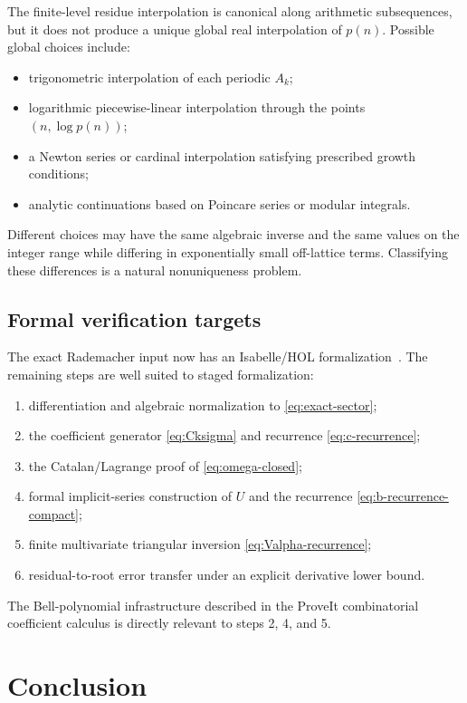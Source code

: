 \documentclass[11pt,a4paper]{article}
\numberwithin{equation}{section}
\theoremstyle{remark}
\begin{document}
The finite-level residue interpolation is canonical along arithmetic subsequences, but it does not produce a unique global real interpolation of $p(n)$.  Possible global choices include:
\begin{itemize}
\item trigonometric interpolation of each periodic $A_k$;
\item logarithmic piecewise-linear interpolation through the points $(n,\log p(n))$;
\item a Newton series or cardinal interpolation satisfying prescribed growth conditions;
\item analytic continuations based on Poincare series or modular integrals.
\end{itemize}
Different choices may have the same algebraic inverse and the same values on the integer range while differing in exponentially small off-lattice terms.  Classifying these differences is a natural nonuniqueness problem.

\subsection{Formal verification targets}

The exact Rademacher input now has an Isabelle/HOL formalization~\cite{EberlPaulson2026}.  The remaining steps are well suited to staged formalization:
\begin{enumerate}
\item differentiation and algebraic normalization to \cref{eq:exact-sector};
\item the coefficient generator \cref{eq:Cksigma} and recurrence \cref{eq:c-recurrence};
\item the Catalan/Lagrange proof of \cref{eq:omega-closed};
\item formal implicit-series construction of $U$ and the recurrence \cref{eq:b-recurrence-compact};
\item finite multivariate triangular inversion \cref{eq:Valpha-recurrence};
\item residual-to-root error transfer under an explicit derivative lower bound.
\end{enumerate}
The Bell-polynomial infrastructure described in the ProveIt combinatorial coefficient calculus is directly relevant to steps 2, 4, and 5.

\section{Conclusion}\label{sec:conclusion}
\end{document}

